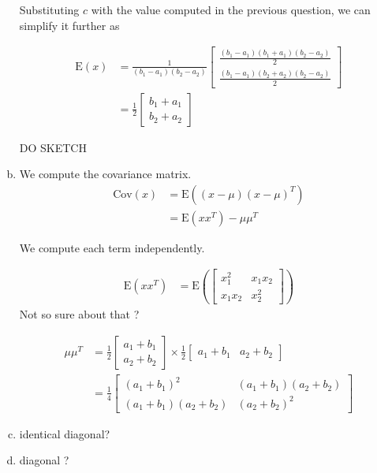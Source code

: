 \documentclass[a4paper, 12pt, twoside]{article}
\begin{document}
\begin{enumerate}[a)]
    Substituting $c$ with the value computed in the previous question, we can simplify it further as

    \begin{align*}
        \mathrm{E}(x) &= \frac{1}{(b_1-a_1)(b_2-a_2)}\begin{bmatrix} \frac{(b_1-a_1)(b_1+a_1)(b_2-a_2)}{2} \\ \frac{(b_1-a_1)(b_2+a_2)(b_2-a_2)}{2} \end{bmatrix} \\
    &= \frac{1}{2}\begin{bmatrix} b_1+a_1 \\ b_2+a_2 \end{bmatrix}
    \end{align*}

    DO SKETCH

    \item We compute the covariance matrix.
    \begin{align*}
        \mathrm{Cov}(x) &= \mathrm{E}((x-\mu)(x-\mu)^T) \\
        &= \mathrm{E}(xx^T) - \mu\mu^T
    \end{align*}

    We compute each term independently.

    \begin{align*}
    \mathrm{E}(xx^T) &= \mathrm{E}(\begin{bmatrix} x_1^2 & x_1x_2 \\ x_1x_2 & x_2^2 \end{bmatrix})
    \end{align*}
    Not so sure about that ?

    \begin{align*}
    \mu\mu^T &= \frac{1}{2}\begin{bmatrix} a_1+b_1 \\ a_2+b_2 \end{bmatrix} \times\frac{1}{2} \begin{bmatrix} a_1+b_1 & a_2+b_2 \end{bmatrix} \\
        &= \frac{1}{4}\begin{bmatrix} (a_1+b_1)^2 & (a_1+b_1)(a_2+b_2) \\ (a_1+b_1)(a_2+b_2) & (a_2+b_2)^2 \end{bmatrix}
    \end{align*}

    \item identical diagonal?
    \item diagonal ?

\end{enumerate}
\end{document}
